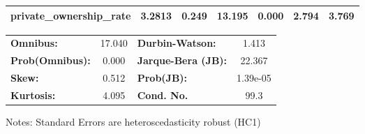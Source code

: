 \begin{center}
\begin{tabular}{lcccccc}
\textbf{private\_ownership\_rate} &       3.2813  &        0.249     &    13.195  &         0.000        &        2.794    &        3.769     \\
\bottomrule
\end{tabular}
\begin{tabular}{lclc}
\textbf{Omnibus:}       & 17.040 & \textbf{  Durbin-Watson:     } &    1.413  \\
\textbf{Prob(Omnibus):} &  0.000 & \textbf{  Jarque-Bera (JB):  } &   22.367  \\
\textbf{Skew:}          &  0.512 & \textbf{  Prob(JB):          } & 1.39e-05  \\
\textbf{Kurtosis:}      &  4.095 & \textbf{  Cond. No.          } &     99.3  \\
\bottomrule
\end{tabular}
\end{center}

Notes: \newline
 [1] Standard Errors are heteroscedasticity robust (HC1)